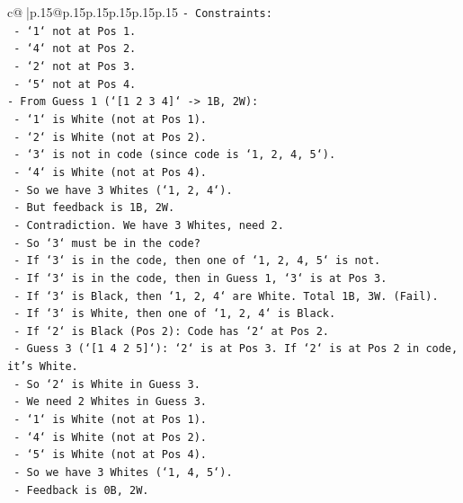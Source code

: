 \documentclass{article}
\begin{document}
{\begin{supertabular}{c@{$\;$}|p{.15\linewidth}@{}p{.15\linewidth}p{.15\linewidth}p{.15\linewidth}p{.15\linewidth}p{.15\linewidth}}
{{{\texttt{{-}   Constraints:} \\
\texttt{    {-}   `1` not at Pos 1.} \\
\texttt{    {-}   `4` not at Pos 2.} \\
\texttt{    {-}   `2` not at Pos 3.} \\
\texttt{    {-}   `5` not at Pos 4.} \\
\texttt{{-}   From Guess 1 (`{[}1 2 3 4{]}` {-}> 1B, 2W):} \\
\texttt{    {-}   `1` is White (not at Pos 1).} \\
\texttt{    {-}   `2` is White (not at Pos 2).} \\
\texttt{    {-}   `3` is not in code (since code is `1, 2, 4, 5`).} \\
\texttt{    {-}   `4` is White (not at Pos 4).} \\
\texttt{    {-}   So we have 3 Whites (`1, 2, 4`).} \\
\texttt{    {-}   But feedback is 1B, 2W.} \\
\texttt{    {-}   Contradiction. We have 3 Whites, need 2.} \\
\texttt{    {-}   So `3` must be in the code?} \\
\texttt{    {-}   If `3` is in the code, then one of `1, 2, 4, 5` is not.} \\
\texttt{    {-}   If `3` is in the code, then in Guess 1, `3` is at Pos 3.} \\
\texttt{    {-}   If `3` is Black, then `1, 2, 4` are White. Total 1B, 3W. (Fail).} \\
\texttt{    {-}   If `3` is White, then one of `1, 2, 4` is Black.} \\
\texttt{    {-}   If `2` is Black (Pos 2): Code has `2` at Pos 2.} \\
\texttt{        {-}   Guess 3 (`{[}1 4 2 5{]}`): `2` is at Pos 3. If `2` is at Pos 2 in code, it's White.} \\
\texttt{        {-}   So `2` is White in Guess 3.} \\
\texttt{        {-}   We need 2 Whites in Guess 3.} \\
\texttt{        {-}   `1` is White (not at Pos 1).} \\
\texttt{        {-}   `4` is White (not at Pos 2).} \\
\texttt{        {-}   `5` is White (not at Pos 4).} \\
\texttt{        {-}   So we have 3 Whites (`1, 4, 5`).} \\
\texttt{        {-}   Feedback is 0B, 2W.} \\
}}}
\end{supertabular}}
\end{document}
